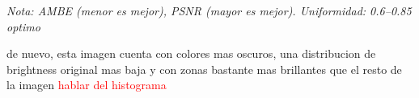 \documentclass[sigchi]{acmart}
\newcommand{\rojo}[1]{\textcolor{red}{#1}}
\begin{document}
\begin{table}[H]
	\centering
	\caption{Métricas de calidad para la imagen 2015\_00027.jpg}
	\label{tab:metricas_2015_00027}
	\vspace{0.5em}


	\vspace{0.5em}
	\footnotesize%
	\textit{Nota: AMBE (menor es mejor), PSNR (mayor es mejor). Uniformidad: 0.6–0.85 optimo}
\end{table}

de nuevo, esta imagen cuenta con colores mas oscuros, una distribucion de brightness original mas baja y
con zonas bastante mas brillantes que el resto de la imagen
\rojo{hablar del histograma}
\end{document}
